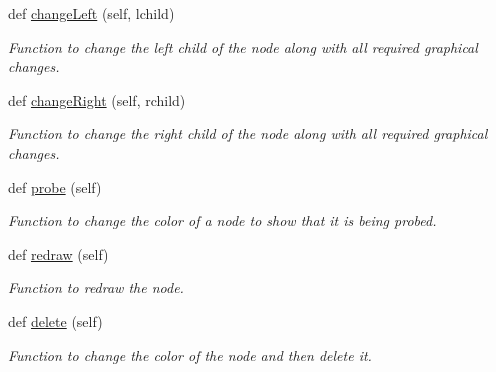 \begin{DoxyCompactItemize}
def \hyperlink{class_binary_search_tree_1_1_binary_tree_node_af69ab5e5100d035c4808ce89e2e6e835}{change\+Left} (self, lchild)
\begin{DoxyCompactList}\small\item\em Function to change the left child of the node along with all required graphical changes. \end{DoxyCompactList}\item 
def \hyperlink{class_binary_search_tree_1_1_binary_tree_node_a630b102ad6c1ccbdca6fd3b8f19260db}{change\+Right} (self, rchild)
\begin{DoxyCompactList}\small\item\em Function to change the right child of the node along with all required graphical changes. \end{DoxyCompactList}\item 
\mbox{\label{class_binary_search_tree_1_1_binary_tree_node_a4be9ddca35a93613097f04ce6be9847c}} 
def \hyperlink{class_binary_search_tree_1_1_binary_tree_node_a4be9ddca35a93613097f04ce6be9847c}{probe} (self)
\begin{DoxyCompactList}\small\item\em Function to change the color of a node to show that it is being probed. \end{DoxyCompactList}\item 
\mbox{\label{class_binary_search_tree_1_1_binary_tree_node_a13edd0042d0de74ee2a9183c2ee4f73b}} 
def \hyperlink{class_binary_search_tree_1_1_binary_tree_node_a13edd0042d0de74ee2a9183c2ee4f73b}{redraw} (self)
\begin{DoxyCompactList}\small\item\em Function to redraw the node. \end{DoxyCompactList}\item 
\mbox{\label{class_binary_search_tree_1_1_binary_tree_node_a4697a030e64bcc4abf33c3c1e10febbd}} 
def \hyperlink{class_binary_search_tree_1_1_binary_tree_node_a4697a030e64bcc4abf33c3c1e10febbd}{delete} (self)
\begin{DoxyCompactList}\small\item\em Function to change the color of the node and then delete it. \end{DoxyCompactList}\end{DoxyCompactItemize}
